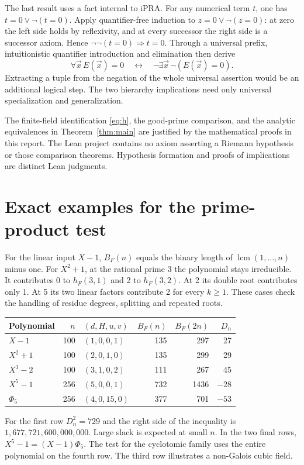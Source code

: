 \documentclass[11pt]{article}
\begin{document}
The last result uses a fact internal to iPRA. For any numerical term \(t\), one has \(t=0\lor\neg(t=0)\). Apply quantifier-free induction to \(z=0\lor\neg(z=0)\): at zero the left side holds by reflexivity, and at every successor the right side is a successor axiom. Hence \(\neg\neg(t=0)\Rightarrow t=0\). Through a universal prefix, intuitionistic quantifier introduction and elimination then derive
\[
  \forall\vec x\,E(\vec x)=0\quad\longleftrightarrow\quad
        \neg\exists\vec x\,\neg(E(\vec x)=0).
\]
Extracting a tuple from the negation of the whole universal assertion would be an additional logical step. The two hierarchy implications need only universal specialization and generalization.

The finite-field identification \eqref{eq:h}, the good-prime comparison, and the analytic equivalences in Theorem~\ref{thm:main} are justified by the mathematical proofs in this report. The Lean project contains no axiom asserting a Riemann hypothesis or those comparison theorems. Hypothesis formation and proofs of implications are distinct Lean judgments.
\newpage
\section{Exact examples for the prime-product test}
For the linear input \(X-1\), \(B_F(n)\) equals the binary length of \(\operatorname{lcm}(1,\ldots,n)\) minus one. For \(X^2+1\), at the rational prime 3 the polynomial stays irreducible. It contributes 0 to \(h_F(3,1)\) and 2 to \(h_F(3,2)\). At 2 its double root contributes only 1. At 5 its two linear factors contribute 2 for every \(k\ge1\). These cases check the handling of residue degrees, splitting and repeated roots.
\begin{center}\small
\begin{tabular}{@{}lrlrrr@{}}\toprule
Polynomial & \(n\) & \((d,H,u,v)\) & \(B_F(n)\) & \(B_F(2n)\) & \(D_n\)\\\midrule
\(X-1\) &100&\((1,0,0,1)\)&135&297&27\\
\(X^2+1\) &100&\((2,0,1,0)\)&135&299&29\\
\(X^3-2\) &100&\((3,1,0,2)\)&111&267&45\\
\(X^5-1\) &256&\((5,0,0,1)\)&732&1436&\(-28\)\\
\(\Phi_5\) &256&\((4,0,15,0)\)&377&701&\(-53\)\\\bottomrule
\end{tabular}
\end{center}
For the first row \(D_n^2=729\) and the right side of the inequality is \(1{,}677{,}721{,}600{,}000{,}000\). Large slack is expected at small \(n\). In the two final rows, \(X^5-1=(X-1)\Phi_5\). The test for the cyclotomic family uses the entire polynomial on the fourth row. The third row illustrates a non-Galois cubic field.
\end{document}

